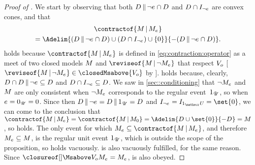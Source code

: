 \documentclass[preprint]{isipta2025}
\begin{document}
\begin{proof}[Proof of ]
We start by observing that both \(\desirset\altcondon\neg\eventopt\cap\desirset\) and \(\desirset\cap\indifset[\neg\eventopt]\) are convex cones, and that
\begin{multline*}
\contractof{\M\given\eventM}\\
=\Adelim{(\desirset\altcondon\neg\eventopt\cap\desirset)\cup(\desirset\cap\indifset[\neg\eventopt])\cup\{0\}}{-(\desirset\altcondon\neg\eventopt\cap\desirset)}.
\end{multline*}
 holds because \(\contractof{\M\given\eventM}\) is defined in \cref{eq:contraction:operator} as a meet of two closed models \(\M\) and \(\reviseof{\M\given\neg\eventM}\) that respect \(\zeroM\) [\(\reviseof{\M\given\neg\eventM}\in\closedMsabove{\zeroM}\) by ].
 holds because, clearly, \(\desirset\cap\desirset\altcondon\neg\eventopt\subseteq\desirset\) and \(\desirset\cap\indifset[\neg\eventopt]\subseteq D\).
We saw in \cref{sec::conditioning} that \(\neg\eventM\) and \(\M\) are only consistent when \(\neg \eventM\) corresponds to the regular event~\(\uniteventopt\), so when \(\eventopt=\nulleventopt=0\).
Since then \(\desirset\altcondon\neg\eventopt=\desirset\altcondon\uniteventopt=\desirset\) and \(\indifset[{\neg\eventopt}]=\indifset[\uniteventopt]=\set{0}\), we can come to the conclusion that \(\contractof{\M\given\eventM}=\contractof{\M\given\eventM[0]}=\Adelim{\desirset\cup\set{0}}{-\desirset}=\M\), so  holds.
The only event for which \(\eventM\subseteq\contractof{\M\given\eventM}\), and therefore \(\eventM\subseteq\M\), is the regular unit event \(\uniteventopt\), which is outside the scope of the proposition, so  holds vacuously.
 is also vacuously fulfilled, for the same reason.
Since \(\Mclsbgof{\zeroM}{\eventM}=\eventM\),  is also obeyed.
\end{proof}
\end{document}
